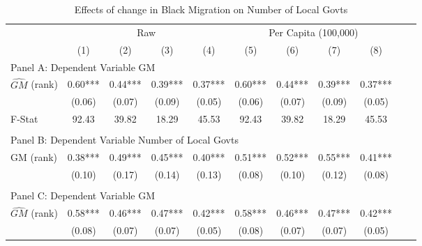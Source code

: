  \begin{table}[htbp]\centering {} \begin{threeparttable} \caption{Effects of change in Black Migration on Number of Local Govts} \begin{tabular}{l*{10}{c}} \toprule
                &\multicolumn{4}{c}{Raw}                                    &\multicolumn{4}{c}{Per Capita (100,000)}                   \\\cmidrule(lr){2-5}\cmidrule(lr){6-9}
                &\multicolumn{1}{c}{(1)}   &\multicolumn{1}{c}{(2)}   &\multicolumn{1}{c}{(3)}   &\multicolumn{1}{c}{(4)}   &\multicolumn{1}{c}{(5)}   &\multicolumn{1}{c}{(6)}   &\multicolumn{1}{c}{(7)}   &\multicolumn{1}{c}{(8)}   \\
\cmidrule(lr){1-9}
\multicolumn{8}{l}{Panel A: Dependent Variable GM}\\
\cmidrule(lr){1-9}
$\hat{GM}$ (rank)&       0.60***&       0.44***&       0.39***&       0.37***&       0.60***&       0.44***&       0.39***&       0.37***\\
                &     (0.06)   &     (0.07)   &     (0.09)   &     (0.05)   &     (0.06)   &     (0.07)   &     (0.09)   &     (0.05)   \\
\midrule
F-Stat          &      92.43   &      39.82   &      18.29   &      45.53   &      92.43   &      39.82   &      18.29   &      45.53   \\
\cmidrule[\heavyrulewidth](lr){1-9} \\ \cmidrule[\heavyrulewidth](lr){1-9}
\multicolumn{8}{l}{Panel B: Dependent Variable Number of Local Govts}\\
\cmidrule(lr){1-9}
GM  (rank)      &       0.38***&       0.49***&       0.45***&       0.40***&       0.51***&       0.52***&       0.55***&       0.41***\\
                &     (0.10)   &     (0.17)   &     (0.14)   &     (0.13)   &     (0.08)   &     (0.10)   &     (0.12)   &     (0.08)   \\
\cmidrule[\heavyrulewidth](lr){1-9} \\ \cmidrule[\heavyrulewidth](lr){1-9}
\multicolumn{8}{l}{Panel C: Dependent Variable GM}\\
\cmidrule(lr){1-9}
$\hat{GM}$ (rank)&       0.58***&       0.46***&       0.47***&       0.42***&       0.58***&       0.46***&       0.47***&       0.42***\\
                &     (0.08)   &     (0.07)   &     (0.07)   &     (0.05)   &     (0.08)   &     (0.07)   &     (0.07)   &     (0.05)   \\

\end{tabular}
\end{threeparttable}
\end{table}
